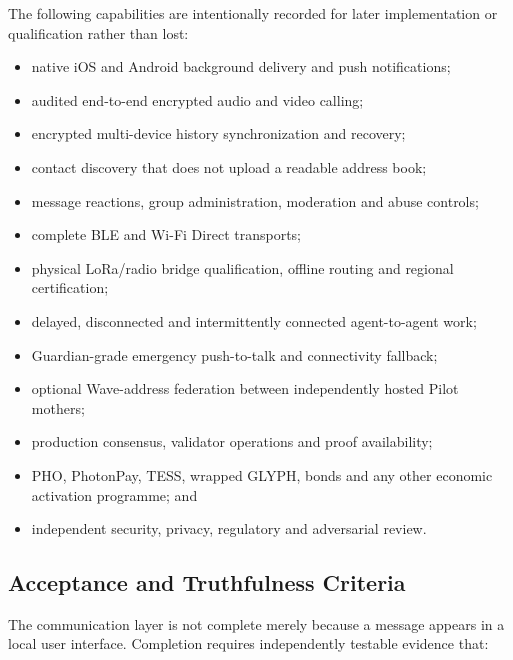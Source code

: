 The following capabilities are intentionally recorded for later implementation
or qualification rather than lost:

\begin{itemize}
  \item native iOS and Android background delivery and push notifications;
  \item audited end-to-end encrypted audio and video calling;
  \item encrypted multi-device history synchronization and recovery;
  \item contact discovery that does not upload a readable address book;
  \item message reactions, group administration, moderation and abuse controls;
  \item complete BLE and Wi-Fi Direct transports;
  \item physical LoRa/radio bridge qualification, offline routing and regional
        certification;
  \item delayed, disconnected and intermittently connected agent-to-agent work;
  \item Guardian-grade emergency push-to-talk and connectivity fallback;
  \item optional Wave-address federation between independently hosted Pilot
        mothers;
  \item production consensus, validator operations and proof availability;
  \item PHO, PhotonPay, TESS, wrapped GLYPH, bonds and any other economic
        activation programme; and
  \item independent security, privacy, regulatory and adversarial review.
\end{itemize}

\subsection{Acceptance and Truthfulness Criteria}

The communication layer is not complete merely because a message appears in a
local user interface. Completion requires independently testable evidence that:

